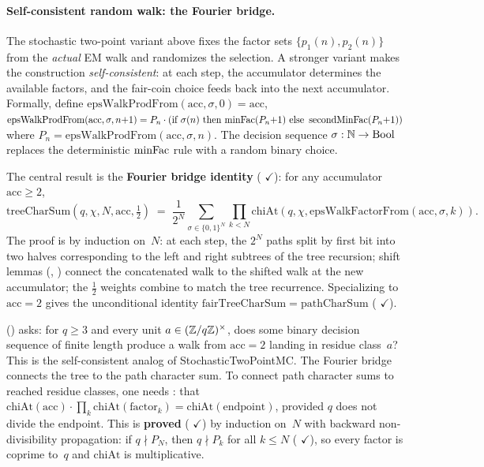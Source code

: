 \paragraph{Self-consistent random walk: the Fourier bridge.}
The stochastic two-point variant above fixes the factor sets
$\{p_1(n), p_2(n)\}$ from the \emph{actual} EM walk and randomizes
the selection.  A stronger variant makes the construction
\emph{self-consistent}: at each step, the accumulator determines the
available factors, and the fair-coin choice feeds back into the next
accumulator.  Formally, define
$\mathrm{epsWalkProdFrom}(\mathrm{acc}, \sigma, 0) = \mathrm{acc}$,
$\mathrm{epsWalkProdFrom}(\mathrm{acc}, \sigma, n{+}1)
= P_n \cdot (\text{if } \sigma(n) \text{ then } \mathrm{minFac}(P_n{+}1)
\text{ else } \operatorname{secondMinFac}(P_n{+}1))$
where $P_n = \mathrm{epsWalkProdFrom}(\mathrm{acc}, \sigma, n)$.
The decision sequence $\sigma : \mathbb{N} \to \mathrm{Bool}$ replaces the
deterministic $\mathrm{minFac}$ rule with a random binary choice.

The central result is the \textbf{Fourier bridge identity}
(
{\color{leanink}$\checkmark$}): for any accumulator $\mathrm{acc} \geq 2$,
\[
  \mathrm{treeCharSum}(q, \chi, N, \mathrm{acc}, \tfrac{1}{2})
  \;=\;
  \frac{1}{2^N}
  \sum_{\sigma \in \{0,1\}^N}
  \prod_{k < N} \mathrm{chiAt}(q, \chi,
    \mathrm{epsWalkFactorFrom}(\mathrm{acc}, \sigma, k)).
\]
The proof is by induction on~$N$: at each step, the $2^N$ paths split
by first bit into two halves corresponding to the left and right
subtrees of the tree recursion; shift lemmas
(, )
connect the concatenated walk to the shifted walk at the new
accumulator; the $\tfrac{1}{2}$ weights combine to match the tree
recurrence.  Specializing to $\mathrm{acc} = 2$ gives the
unconditional identity
$\mathrm{fairTreeCharSum} = \mathrm{pathCharSum}$
(
{\color{leanink}$\checkmark$}).

()
asks: for $q \geq 3$ and every unit $a \in (\mathbb{Z}/q\mathbb{Z})^\times$, does
some binary decision sequence of finite length produce a walk from
$\mathrm{acc} = 2$ landing in residue class~$a$?  This is the
self-consistent analog of StochasticTwoPointMC.
The Fourier bridge connects the tree to the path character sum.
To connect path character sums to reached residue classes, one needs
: that $\mathrm{chiAt}(\mathrm{acc})
\cdot \prod_k \mathrm{chiAt}(\text{factor}_k)
= \mathrm{chiAt}(\text{endpoint})$, provided $q$ does not divide the
endpoint.  This is \textbf{proved}
(
{\color{leanink}$\checkmark$})
by induction on~$N$ with backward non-divisibility propagation:
if $q \nmid P_N$, then $q \nmid P_k$ for all $k \leq N$
(
{\color{leanink}$\checkmark$}),
so every factor is coprime to~$q$ and $\mathrm{chiAt}$ is
multiplicative.

